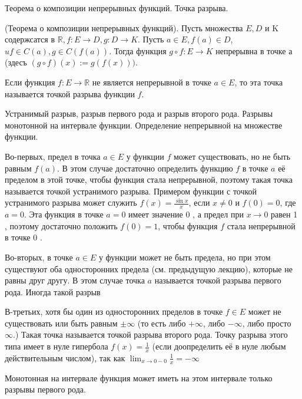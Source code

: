 \newpage
\begin{problem}
Теорема о композиции непрерывных функций. Точка разрыва.
\end{problem}
\begin{proposition}
    (Теорема о композиции непрерывных функций). Пусть множества $E, D$ и K содержсатся в $\mathbb{R}, f: E \rightarrow D, g: D \rightarrow K$. Пусть $a \in E, f(a) \in D$, $u f \in C(a), g \in C(f(a))$. Тогда функция $g \circ f: E \rightarrow K$ непрерывна в точке а (здесъ $(g \circ f)(x):=g(f(x)))$.
\end{proposition}

\begin{definition}
    Если функция $f: E \rightarrow \mathbb{R}$ не является непрерывной в точке $a \in E$, то эта точка называется точкой разрыва функции $f$.
\end{definition}

\newpage
\begin{problem}
Устранимый разрыв, разрыв первого рода и разрыв второго рода. Разрывы монотонной
на интервале функции. Определение непрерывной на множестве функции.
\end{problem}
Во-первых, предел в точка $a \in E$ у функции $f$ может существовать, но не быть равным $f(a)$. В этом случае достаточно определить функцию $f$ в точке $a$ её пределом в этой точке, чтобы функция стала непрерывной, поэтому такая точка называется точкой устранимого разрыва. Примером функции с точкой устранимого разрыва может служить $f(x)=\frac{\sin x}{x}$, если $x \neq 0$ и $f(0)=0$, где $a=0$. Эта функция в точке $a=0$ имеет значение 0 , а предел при $x \rightarrow 0$ равен 1 , поэтому достаточно положить $f(0)=1$, чтобы функция $f$ стала непрерывной в точке 0 .

Во-вторых, в точке $a \in E$ у функции может не быть предела, но при этом существуют оба односторонних предела (см. предыдущую лекцию), которые не равны друг другу. В этом случае точка $a$ называется точкой разрыва первого рода. Иногда такой разрыв

В-третьих, хотя бы один из односторонних пределов в точке $f \in E$ может не существовать или быть равным $\pm \infty$ (то есть либо $+\infty$, либо $-\infty$, либо просто $\infty$.) Такая точка называется точкой разрыва второго рода. Точку разрыва этого типа имеет в нуле гипербола $f(x)=\frac{1}{x}$ (если доопределить её в нуле любым действительным числом), так как $\lim _{x \rightarrow 0-0} \frac{1}{x}=-\infty$
\begin{proposition}
    Монотонная на интервале функция может иметь на этом интервале только разрывы первого рода.
\end{proposition}


